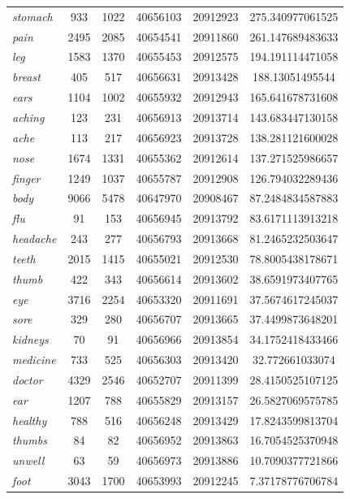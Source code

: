 \begin{table}
{\begin{tabular}[t]{l *{2}{S[table-format=4]} *{2}{S[table-format=8]} S}
\textit{stomach} & 933 & 1022 & 40656103 & 20912923 & 275.340977061525 \\
\textit{pain} & 2495 & 2085 & 40654541 & 20911860 & 261.147689483633 \\
\textit{leg} & 1583 & 1370 & 40655453 & 20912575 & 194.191114471058 \\
\textit{breast} & 405 & 517 & 40656631 & 20913428 & 188.13051495544 \\
\textit{ears} & 1104 & 1002 & 40655932 & 20912943 & 165.641678731608 \\
\textit{aching} & 123 & 231 & 40656913 & 20913714 & 143.683447130158 \\
\textit{ache} & 113 & 217 & 40656923 & 20913728 & 138.281121600028 \\
\textit{nose} & 1674 & 1331 & 40655362 & 20912614 & 137.271525986657 \\
\textit{finger} & 1249 & 1037 & 40655787 & 20912908 & 126.794032289436 \\
\textit{body} & 9066 & 5478 & 40647970 & 20908467 & 87.2484834587883 \\
\textit{flu} & 91 & 153 & 40656945 & 20913792 & 83.6171113913218 \\
\textit{headache} & 243 & 277 & 40656793 & 20913668 & 81.2465232503647 \\
\textit{teeth} & 2015 & 1415 & 40655021 & 20912530 & 78.8005438178671 \\
\textit{thumb} & 422 & 343 & 40656614 & 20913602 & 38.6591973407765 \\
\textit{eye} & 3716 & 2254 & 40653320 & 20911691 & 37.5674617245037 \\
\textit{sore} & 329 & 280 & 40656707 & 20913665 & 37.4499873648201 \\
\textit{kidneys} & 70 & 91 & 40656966 & 20913854 & 34.1752418433466 \\
\textit{medicine} & 733 & 525 & 40656303 & 20913420 & 32.772661033074 \\
\textit{doctor} & 4329 & 2546 & 40652707 & 20911399 & 28.4150525107125 \\
\textit{ear} & 1207 & 788 & 40655829 & 20913157 & 26.5827069575785 \\
\textit{healthy} & 788 & 516 & 40656248 & 20913429 & 17.8243599813704 \\
\textit{thumbs} & 84 & 82 & 40656952 & 20913863 & 16.7054525370948 \\
\textit{unwell} & 63 & 59 & 40656973 & 20913886 & 10.7090377721866 \\
\textit{foot} & 3043 & 1700 & 40653993 & 20912245 & 7.37178776706784 \\

\end{tabular}}
\end{table}
